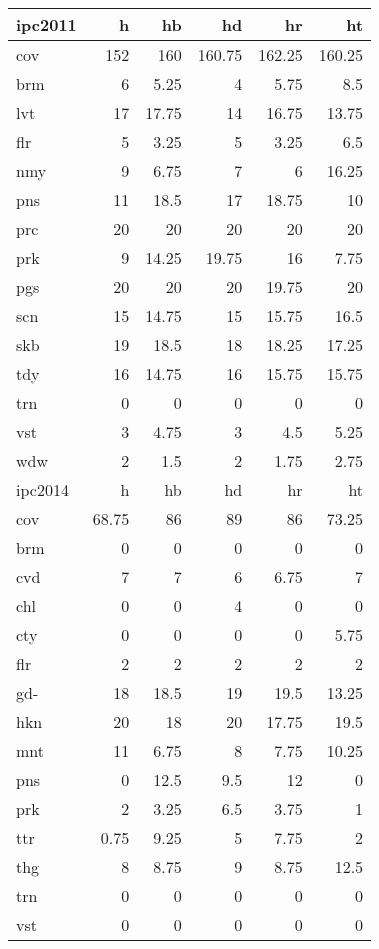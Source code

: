 \begin{center}
\begin{tabular}{lrrrrr}
ipc2011 & h & hb & hd & hr & ht\\
\hline
cov & 152 & 160 & 160.75 & 162.25 & 160.25\\
\hline
brm & 6 & 5.25 & 4 & 5.75 & 8.5\\
lvt & 17 & 17.75 & 14 & 16.75 & 13.75\\
flr & 5 & 3.25 & 5 & 3.25 & 6.5\\
nmy & 9 & 6.75 & 7 & 6 & 16.25\\
pns & 11 & 18.5 & 17 & 18.75 & 10\\
prc & 20 & 20 & 20 & 20 & 20\\
prk & 9 & 14.25 & 19.75 & 16 & 7.75\\
pgs & 20 & 20 & 20 & 19.75 & 20\\
scn & 15 & 14.75 & 15 & 15.75 & 16.5\\
skb & 19 & 18.5 & 18 & 18.25 & 17.25\\
tdy & 16 & 14.75 & 16 & 15.75 & 15.75\\
trn & 0 & 0 & 0 & 0 & 0\\
vst & 3 & 4.75 & 3 & 4.5 & 5.25\\
wdw & 2 & 1.5 & 2 & 1.75 & 2.75\\
\hline
ipc2014 & h & hb & hd & hr & ht\\
\hline
cov & 68.75 & 86 & 89 & 86 & 73.25\\
\hline
brm & 0 & 0 & 0 & 0 & 0\\
cvd & 7 & 7 & 6 & 6.75 & 7\\
chl & 0 & 0 & 4 & 0 & 0\\
cty & 0 & 0 & 0 & 0 & 5.75\\
flr & 2 & 2 & 2 & 2 & 2\\
gd- & 18 & 18.5 & 19 & 19.5 & 13.25\\
hkn & 20 & 18 & 20 & 17.75 & 19.5\\
mnt & 11 & 6.75 & 8 & 7.75 & 10.25\\
pns & 0 & 12.5 & 9.5 & 12 & 0\\
prk & 2 & 3.25 & 6.5 & 3.75 & 1\\
ttr & 0.75 & 9.25 & 5 & 7.75 & 2\\
thg & 8 & 8.75 & 9 & 8.75 & 12.5\\
trn & 0 & 0 & 0 & 0 & 0\\
vst & 0 & 0 & 0 & 0 & 0\\
\hline
\end{tabular}
\end{center}


